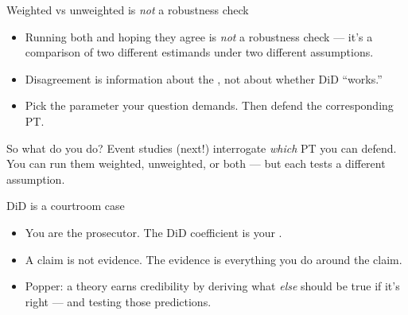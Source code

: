 \documentclass[aspectratio=169,11pt]{beamer}
\begin{document}
\begin{frame}{Weighted vs unweighted is \textit{not} a robustness check}
\vspace{0.4em}
\begin{itemize}\small
  \item Running both and hoping they agree is \textit{not} a robustness check --- it's a comparison of two different estimands under two different assumptions.
  \item Disagreement is information about the , not about whether DiD ``works.''
  \item Pick the parameter your question demands. Then defend the corresponding PT.
\end{itemize}
\vspace{0.6em}
\begin{block}{So what do you do?}
\small
Event studies (next!) interrogate \textit{which} PT you can defend. You can run them weighted, unweighted, or both --- but each tests a different assumption.
\end{block}
\vspace{0.2em}
\end{frame}


\begin{frame}{DiD is a courtroom case}
\vspace{0.8em}
\vspace{0.6em}
\begin{itemize}
  \item You are the prosecutor. The DiD coefficient is your .
  \item A claim is not evidence. The evidence is everything you do around the claim.
  \item Popper: a theory earns credibility by deriving what \textit{else} should be true if it's right --- and testing those predictions.
\end{itemize}
\end{frame}
\end{document}
